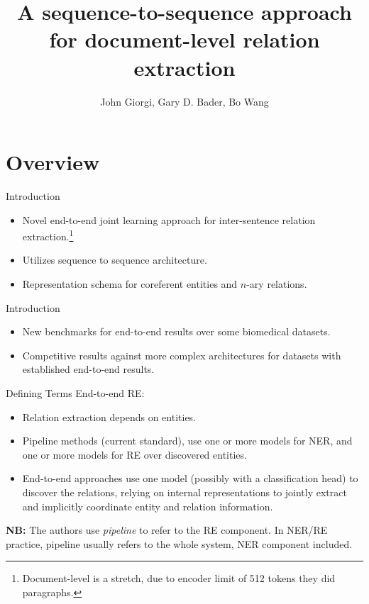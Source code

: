 \documentclass[usenames,dvipsnames,pdf]{beamer}
\title{A sequence-to-sequence approach for document-level relation extraction}
\author{John Giorgi, Gary D. Bader, Bo Wang}
\begin{document}
	\begin{frame}
		\titlepage
	\end{frame}


        \section{Overview}

        \begin{frame}{Introduction}
          \begin{itemize}
          \item
            Novel end-to-end joint learning approach for inter-sentence relation extraction.\footnote{Document-level is a stretch, due to encoder limit of 512 tokens they did paragraphs.}
          \item
            Utilizes sequence to sequence architecture.
          \item
            Representation schema for coreferent entities and $n$-ary relations.
          \end{itemize}
        \end{frame}

        \begin{frame}{Introduction}
          \begin{itemize}
          \item
            New benchmarks for end-to-end results over some biomedical datasets.
          \item
            Competitive results against more complex architectures for datasets
            with established end-to-end results.
          \end{itemize}
        \end{frame}

        \begin{frame}{Defining Terms}
          End-to-end RE:
          \begin{itemize}
          \item
            Relation extraction depends on entities.
          \item
            Pipeline methods (current standard),
            use one or more models for NER,
            and one or more models for RE over discovered entities.
          \item
            End-to-end approaches use one model
            (possibly with a classification head)
            to discover the relations,
            relying on internal representations to jointly extract
            and implicitly coordinate entity and relation information.
          \end{itemize}

          \textbf{NB:}  The authors use \textit{pipeline} to refer to the RE component.
          In NER/RE practice, pipeline usually refers to the whole system, NER component included.  
        \end{frame}
\end{document}
